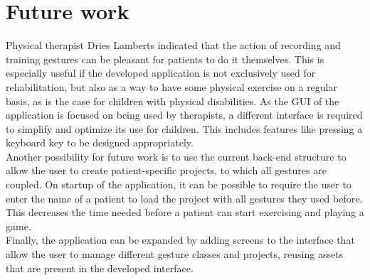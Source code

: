 \section{Future work}

Physical therapist Dries Lamberts indicated that the action of recording and training gestures can be pleasant for patients to do it themselves. This is especially useful if the developed application is not exclusively used for rehabilitation, but also as a way to have some physical exercise on a regular basis, as is the case for children with physical disabilities. As the GUI of the application is focused on being used by therapists, a different interface is required to simplify and optimize its use for children. This includes features like pressing a keyboard key to be designed appropriately.\\

Another possibility for future work is to use the current back-end structure to allow the user to create patient-specific projects, to which all gestures are coupled. On startup of the application, it can be possible to require the user to enter the name of a patient to load the project with all gestures they used before. This decreases the time needed before a patient can start exercising and playing a game.\\

Finally, the application can be expanded by adding screens to the interface that allow the user to manage different gesture classes and projects, reusing assets that are present in the developed interface.
